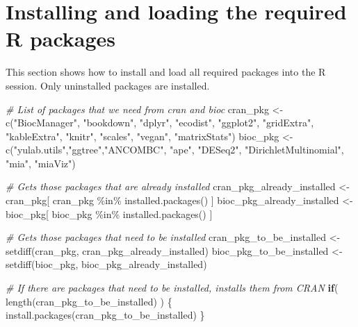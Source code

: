 \documentclass[
  oneside]{book}
\newenvironment{Shaded}{\begin{snugshade}}{\end{snugshade}}
\newcommand{\CommentTok}[1]{\textcolor[rgb]{0.56,0.35,0.01}{\textit{#1}}}
\newcommand{\ControlFlowTok}[1]{\textcolor[rgb]{0.13,0.29,0.53}{\textbf{#1}}}
\newcommand{\FunctionTok}[1]{\textcolor[rgb]{0.00,0.00,0.00}{#1}}
\newcommand{\NormalTok}[1]{#1}
\newcommand{\OtherTok}[1]{\textcolor[rgb]{0.56,0.35,0.01}{#1}}
\newcommand{\SpecialCharTok}[1]{\textcolor[rgb]{0.00,0.00,0.00}{#1}}
\newcommand{\StringTok}[1]{\textcolor[rgb]{0.31,0.60,0.02}{#1}}
\begin{document}
\hypertarget{installing-and-loading-the-required-r-packages}{%
\section{Installing and loading the required R packages}\label{installing-and-loading-the-required-r-packages}}

This section shows how to install and load all required packages into
the R session. Only uninstalled packages are installed.

\begin{Shaded}
\begin{Highlighting}[]
\CommentTok{\# List of packages that we need from cran and bioc }
\NormalTok{cran\_pkg }\OtherTok{\textless{}{-}} \FunctionTok{c}\NormalTok{(}\StringTok{"BiocManager"}\NormalTok{, }\StringTok{"bookdown"}\NormalTok{, }\StringTok{"dplyr"}\NormalTok{, }\StringTok{"ecodist"}\NormalTok{, }\StringTok{"ggplot2"}\NormalTok{, }
              \StringTok{"gridExtra"}\NormalTok{, }\StringTok{"kableExtra"}\NormalTok{,  }\StringTok{"knitr"}\NormalTok{, }\StringTok{"scales"}\NormalTok{, }\StringTok{"vegan"}\NormalTok{, }\StringTok{"matrixStats"}\NormalTok{)}
\NormalTok{bioc\_pkg }\OtherTok{\textless{}{-}} \FunctionTok{c}\NormalTok{(}\StringTok{"yulab.utils"}\NormalTok{,}\StringTok{"ggtree"}\NormalTok{,}\StringTok{"ANCOMBC"}\NormalTok{, }\StringTok{"ape"}\NormalTok{, }\StringTok{"DESeq2"}\NormalTok{, }\StringTok{"DirichletMultinomial"}\NormalTok{, }\StringTok{"mia"}\NormalTok{, }\StringTok{"miaViz"}\NormalTok{)}

\CommentTok{\# Gets those packages that are already installed}
\NormalTok{cran\_pkg\_already\_installed }\OtherTok{\textless{}{-}}\NormalTok{ cran\_pkg[ cran\_pkg }\SpecialCharTok{\%in\%} \FunctionTok{installed.packages}\NormalTok{() ]}
\NormalTok{bioc\_pkg\_already\_installed }\OtherTok{\textless{}{-}}\NormalTok{ bioc\_pkg[ bioc\_pkg }\SpecialCharTok{\%in\%} \FunctionTok{installed.packages}\NormalTok{() ]}

\CommentTok{\# Gets those packages that need to be installed}
\NormalTok{cran\_pkg\_to\_be\_installed }\OtherTok{\textless{}{-}} \FunctionTok{setdiff}\NormalTok{(cran\_pkg, cran\_pkg\_already\_installed)}
\NormalTok{bioc\_pkg\_to\_be\_installed }\OtherTok{\textless{}{-}} \FunctionTok{setdiff}\NormalTok{(bioc\_pkg, bioc\_pkg\_already\_installed)}
\end{Highlighting}
\end{Shaded}

\begin{Shaded}
\begin{Highlighting}[]
\CommentTok{\# If there are packages that need to be installed, installs them from CRAN}
\ControlFlowTok{if}\NormalTok{( }\FunctionTok{length}\NormalTok{(cran\_pkg\_to\_be\_installed) ) \{}
   \FunctionTok{install.packages}\NormalTok{(cran\_pkg\_to\_be\_installed)}
\NormalTok{\}}
\end{Highlighting}
\end{Shaded}
\end{document}
